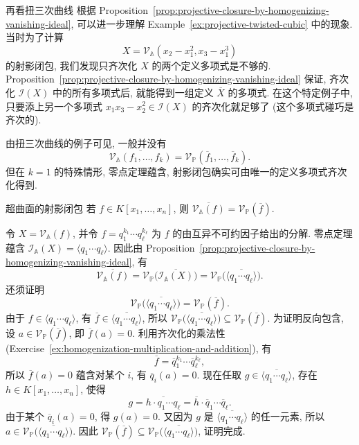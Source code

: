 \begin{Example}{再看扭三次曲线}\leavevmode\label{ex:homogenizing-twisted-cubic-ideal}
根据 Proposition~\ref{prop:projective-closure-by-homogenizing-vanishing-ideal}, 可以进一步理解 Example~\ref{ex:projective-twisted-cubic} 中的现象. 当时为了计算
\[
  X=\mathcal{V}_{\mathbb{A}}(x_{2}-x_{1}^{2},x_{3}-x_{1}^{3})
\]
的射影闭包, 我们发现只齐次化 $X$ 的两个定义多项式是不够的. Proposition~\ref{prop:projective-closure-by-homogenizing-vanishing-ideal} 保证, 齐次化 $\mathcal{I}(X)$ 中的所有多项式后, 就能得到一组定义 $\overline{X}$ 的多项式. 在这个特定例子中, 只要添上另一个多项式 $x_{1}x_{3}-x_{2}^{2}\in\mathcal{I}(X)$ 的齐次化就足够了 (这个多项式碰巧是齐次的).
\end{Example}

由扭三次曲线的例子可见, 一般并没有
\[
  \overline{\mathcal{V}_{\mathbb{A}}(f_{1},\ldots,f_{k})}
    =\mathcal{V}_{\mathbb{P}}(\overline{f}_{1},\ldots,\overline{f}_{k}).
\]
但在 $k=1$ 的特殊情形, 零点定理蕴含, 射影闭包确实可由唯一的定义多项式齐次化得到.

\begin{Proposition}{超曲面的射影闭包}\leavevmode\label{prop:projective-closure-of-hypersurface}
若 $f\in K[x_{1},\ldots,x_{n}]$, 则 $\overline{\mathcal{V}_{\mathbb{A}}(f)}=\mathcal{V}_{\mathbb{P}}(\overline{f})$.
\end{Proposition}
\begin{Proof}
令 $X=\mathcal{V}_{\mathbb{A}}(f)$, 并令 $f=q_{1}^{k_{1}}\cdots q_{\ell}^{k_{\ell}}$ 为 $f$ 的由互异不可约因子给出的分解. 零点定理蕴含 $\mathcal{I}_{\mathbb{A}}(X)=\langle q_{1}\cdots q_{\ell}\rangle$. 因此由 Proposition~\ref{prop:projective-closure-by-homogenizing-vanishing-ideal}, 有
\[
  \overline{\mathcal{V}_{\mathbb{A}}(f)}=
  \mathcal{V}_{\mathbb{P}}\bigl(\overline{\mathcal{I}_{\mathbb{A}}(X)}\bigr)=
  \mathcal{V}_{\mathbb{P}}\bigl(\overline{\langle q_{1}\cdots q_{\ell}\rangle}\bigr).
\]
还须证明
\[
  \mathcal{V}_{\mathbb{P}}\bigl(\overline{\langle q_{1}\cdots q_{\ell}\rangle}\bigr)
  =\mathcal{V}_{\mathbb{P}}(\overline{f}).
\]
由于 $f\in\langle q_{1}\cdots q_{\ell}\rangle$, 有 $\overline{f}\in\overline{\langle q_{1}\cdots q_{\ell}\rangle}$, 所以 $\mathcal{V}_{\mathbb{P}}\bigl(\overline{\langle q_{1}\cdots q_{\ell}\rangle}\bigr)\subseteq\mathcal{V}_{\mathbb{P}}(\overline{f})$. 为证明反向包含, 设 $a\in\mathcal{V}_{\mathbb{P}}(\overline{f})$, 即 $\overline{f}(a)=0$. 利用齐次化的乘法性 (Exercise~\ref{ex:homogenization-multiplication-and-addition}), 有
\[
  \overline{f}=\overline{q}_{1}^{k_{1}}\cdots\overline{q}_{\ell}^{k_{\ell}},
\]
所以 $\overline{f}(a)=0$ 蕴含对某个 $i$, 有 $\overline{q}_{i}(a)=0$. 现在任取 $g\in\overline{\langle q_{1}\cdots q_{\ell}\rangle}$, 存在 $h\in K[x_{1},\ldots,x_{n}]$, 使得
\[
  g=\overline{h\cdot q_{1}\cdots q_{\ell}}=\overline{h}\cdot\overline{q}_{1}\cdots\overline{q}_{\ell}.
\]
由于某个 $\overline{q}_{i}(a)=0$, 得 $g(a)=0$. 又因为 $g$ 是 $\overline{\langle q_{1}\cdots q_{\ell}\rangle}$ 的任一元素, 所以 $a\in\mathcal{V}_{\mathbb{P}}\bigl(\overline{\langle q_{1}\cdots q_{\ell}\rangle}\bigr)$. 因此 $\mathcal{V}_{\mathbb{P}}(\overline{f})\subseteq\mathcal{V}_{\mathbb{P}}\bigl(\overline{\langle q_{1}\cdots q_{\ell}\rangle}\bigr)$, 证明完成.
\end{Proof}

